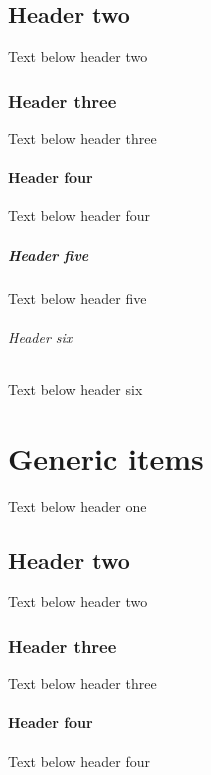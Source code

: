 \documentclass[a4paper,10pt,icelandic]{sphinxmanual}
\begin{document}
\section{Header two}
\label{\detokenize{blocks/index:header-two}}
\sphinxAtStartPar
Text below header two


\subsection{Header three}
\label{\detokenize{blocks/index:header-three}}
\sphinxAtStartPar
Text below header three


\subsubsection{Header four}
\label{\detokenize{blocks/index:header-four}}
\sphinxAtStartPar
Text below header four


\paragraph{Header five}
\label{\detokenize{blocks/index:header-five}}
\sphinxAtStartPar
Text below header five


\subparagraph{Header six}
\label{\detokenize{blocks/index:header-six}}
\sphinxAtStartPar
Text below header six

\sphinxstepscope


\chapter{Generic items}
\label{\detokenize{generic-items/index:generic-items}}\label{\detokenize{generic-items/index::doc}}
\sphinxAtStartPar
Text below header one


\section{Header two}
\label{\detokenize{generic-items/index:header-two}}
\sphinxAtStartPar
Text below header two


\subsection{Header three}
\label{\detokenize{generic-items/index:header-three}}
\sphinxAtStartPar
Text below header three


\subsubsection{Header four}
\label{\detokenize{generic-items/index:header-four}}
\sphinxAtStartPar
Text below header four
\end{document}

